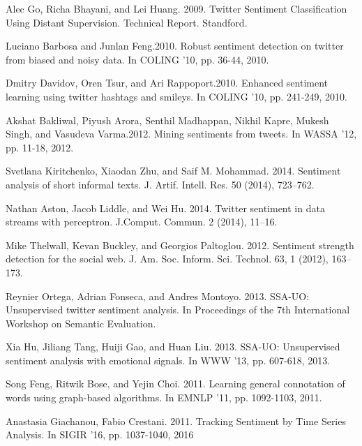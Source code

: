 \documentclass[runningheads]{llncs}
\begin{document}
\begin{thebibliography}{8}
Alec Go, Richa Bhayani, and Lei Huang. 2009.
\newblock Twitter Sentiment Classification Using Distant Supervision.
\newblock Technical Report. Standford.

Luciano Barbosa and Junlan Feng.2010.
\newblock Robust sentiment detection on twitter from biased and noisy data.
\newblock In COLING ’10, pp. 36-44, 2010.

Dmitry Davidov, Oren Tsur, and Ari Rappoport.2010.
\newblock Enhanced sentiment learning using twitter hashtags and smileys.
\newblock In COLING ’10, pp. 241-249, 2010.

Akshat Bakliwal, Piyush Arora, Senthil Madhappan, Nikhil Kapre, Mukesh Singh, and Vasudeva Varma.2012.
\newblock Mining sentiments from tweets.
\newblock In WASSA ’12, pp. 11-18, 2012.

Svetlana Kiritchenko, Xiaodan Zhu, and Saif M. Mohammad. 2014.
\newblock Sentiment analysis of short informal texts.
\newblock J. Artif. Intell. Res. 50 (2014), 723–762.

Nathan Aston, Jacob Liddle, and Wei Hu. 2014.
\newblock Twitter sentiment in data streams with perceptron.
\newblock  J.Comput. Commun. 2 (2014), 11–16.

Mike Thelwall, Kevan Buckley, and Georgios Paltoglou. 2012.
\newblock Sentiment strength detection for the social web.
\newblock J. Am. Soc. Inform. Sci. Technol. 63, 1 (2012), 163–173.

Reynier Ortega, Adrian Fonseca, and Andres Montoyo. 2013.
\newblock SSA-UO: Unsupervised twitter sentiment analysis.
\newblock In Proceedings of the 7th International Workshop on Semantic Evaluation.

Xia Hu, Jiliang Tang, Huiji Gao, and Huan Liu. 2013.
\newblock SSA-UO: Unsupervised sentiment analysis with emotional signals.
\newblock In WWW ’13, pp. 607-618, 2013.

Song Feng, Ritwik Bose, and Yejin Choi. 2011.
\newblock Learning general connotation of words using graph-based algorithms.
\newblock In EMNLP ’11, pp. 1092-1103, 2011.

Anastasia Giachanou, Fabio Crestani. 2011.
\newblock Tracking Sentiment by Time Series Analysis.
\newblock In SIGIR ’16, pp. 1037-1040, 2016


\end{thebibliography}
\end{document}
